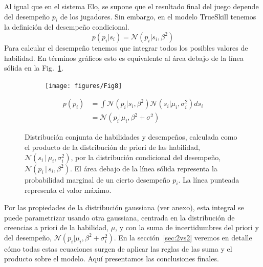 \documentclass[a4paper,11pt]{book}
\newcommand{\N}{\mathcal{N}}
\theoremstyle{definition}
\begin{document}

Al igual que en el sistema Elo, se supone que el resultado final del juego depende del desempe\~no $p_i$ de los jugadores.
%
Sin embargo, en el modelo TrueSkill tenemos la definici\'on del desempe\~no condicional.
%
\begin{equation}
p(p_i|s_i) = \N(p_i | s_i, \beta^2)
\end{equation}
%
Para calcular el desempe\~no tenemos que integrar todos los posibles valores de habilidad.
%
En t\'erminos gr\'aficos esto es equivalente al \'area debajo de la l\'inea s\'olida en la Fig.~\ref{paso_1_multiplicacion_normales}.
%
\begin{figure}[ht!]
\centering
\begin{subfigure}[c]{0.4\textwidth}
\centering
\texttt{[image: figures/Fig8]}
\end{subfigure}
\begin{subfigure}[c]{0.5\textwidth}
\begin{align*}\label{p.p_i}
p(p_i) & = \int \N(p_i | s_i, \beta^2) \N(s_i | \mu_i,\sigma_i^2) ds_i  \\
&= \N(p_i|\mu_i, \beta^2 + \sigma^2)
\end{align*}
\end{subfigure}
\caption{Distribuci\'on conjunta de habilidades y desempe\~nos, calculada como el producto de la distribuci\'on de priori de las habilidad, $\N(s_i \, | \, \mu_i, \sigma_i^2)$, por la distribuci\'on condicional del desempe\~no, $\N(p_i \, | \, s_i, \beta^2)$.
%
El \'area debajo de la l\'inea s\'olida representa la probabilidad marginal de un cierto desempe\~no $p_i$.
%
La l\'inea punteada representa el valor m\'aximo.
}
\label{paso_1_multiplicacion_normales}
\end{figure}
%
Por las propiedades de la distribuci\'on gaussiana (ver anexo), esta integral se puede parametrizar usando otra gaussiana, centrada en la distribuci\'on de creencias a priori de la habilidad, $\mu$, y con la suma de incertidumbres del priori y del desempe\~no, $\N(p_i | \mu_i, \beta^2 +\sigma_i^2)$.
%
En la secci\'on~\ref{sec:2vs2} veremos en detalle c\'omo todas estas ecuaciones surgen de aplicar las reglas de las suma y el producto sobre el modelo.
%
Aqu\'i presentamos las conclusiones finales.

\end{document}
